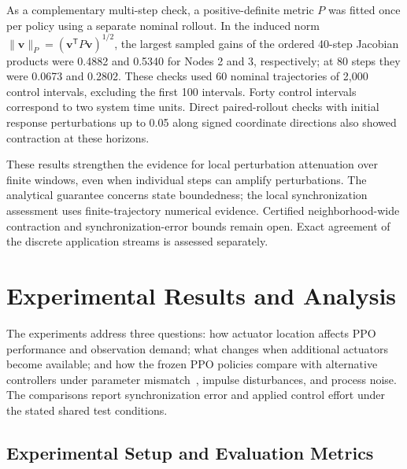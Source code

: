 \documentclass[a4paper,fleqn]{cas-sc}
\theoremstyle{plain}
\theoremstyle{definition}
\begin{document}
As a complementary multi-step check, a positive-definite metric $P$ was fitted once per policy using a separate nominal rollout. In the induced norm $\|\mathbf{v}\|_P=(\mathbf{v}^{\mathsf T}P\mathbf{v})^{1/2}$, the largest sampled gains of the ordered 40-step Jacobian products were 0.4882 and 0.5340 for Nodes 2 and 3, respectively; at 80 steps they were 0.0673 and 0.2802. These checks used 60 nominal trajectories of 2,000 control intervals, excluding the first 100 intervals. Forty control intervals correspond to two system time units. Direct paired-rollout checks with initial response perturbations up to 0.05 along signed coordinate directions also showed contraction at these horizons.

These results strengthen the evidence for local perturbation attenuation over finite windows, even when individual steps can amplify perturbations. The analytical guarantee concerns state boundedness; the local synchronization assessment uses finite-trajectory numerical evidence. Certified neighborhood-wide contraction and synchronization-error bounds remain open. Exact agreement of the discrete application streams is assessed separately.

\section{Experimental Results and Analysis}
\label{sec:experiments}

The experiments address three questions: how actuator location affects PPO performance and observation demand; what changes when additional actuators become available; and how the frozen PPO policies compare with alternative controllers under parameter mismatch~\cite{kobiolka2025reducedorder}, impulse disturbances, and process noise. The comparisons report synchronization error and applied control effort under the stated shared test conditions.

\subsection{Experimental Setup and Evaluation Metrics}
\label{subsec:experimental_setup}
\end{document}
